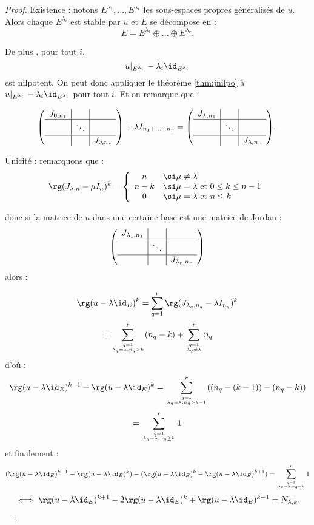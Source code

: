 \documentclass[class=report,crop=false]{standalone}
\newcommand{\Res}[1]{{\left | {}_{#1} \right.}}
\begin{document}
\begin{proof}
Existence : notons $E^{\lambda_1},...,E^{\lambda_r}$ les sous-espaces propres généralisés de $u$. Alors chaque $E^{\lambda_i}$ est stable par $u$ et $E$ se décompose en :
\[E = E^{\lambda_1} \oplus ... \oplus E^{\lambda_r} .\]

De plus , pour tout $i$, \[u\Res{E^{\lambda_i}} -\lambda_i\id_{E^{\lambda_i}}\]
est nilpotent. On peut donc appliquer le théorème \ref{thm:jnilpo} à $u\Res{E^{\lambda_i}} -\lambda_i\id_{E^{\lambda_i}}$ pour tout $i$. Et on remarque que :

\[\left(\begin{array}{c|c|c}
J_{0,n_1}&&\\\hline
&\ddots&\\\hline
&&J_{0,n_r}
\end{array}\right) + \lambda I_{n_1+...+n_r} = \left(\begin{array}{c|c|c}
J_{\lambda,n_1}&&\\\hline
&\ddots&\\\hline
&&J_{\lambda,n_r}
\end{array}\right).\]

Unicité : remarquons que :
\[\rg (J_{\lambda,n} -\mu I_n)^k = \left\{ \begin{array}{cl}
n & \si \mu \neq \lambda\\
n-k & \si \mu = \lambda \text{ et } 0 \le k \le n-1\\
0 & \si \mu = \lambda \text{ et } n \le k
\end{array}\right.\]

donc si la matrice de $u$ dans une certaine base est une matrice de Jordan :
\[
\left(\begin{array}{c|c|c}
J_{\lambda_1,n_1}&&\\\hline
&\ddots&\\\hline
&&J_{\lambda_r,n_r}
\end{array}\right)\]
alors :
 
\[\rg(u-\lambda\id_E)^k = \sum_{q=1}^r \rg ( J_{\lambda_q,n_q}-\lambda I_{n_q})^k\]
\[= \sum_{q=1\atop \lambda_q = \lambda , n_q > k}^r (n_q-k) + \sum_{q=1 \atop \lambda_q \neq \lambda}^r n_q\]
d'où :\[ \rg(u-\lambda\id_E)^{k-1} - \rg(u-\lambda\id_E)^{k } = \sum_{q=1 \atop \lambda_q = \lambda , n_q >k -1 }^r ((n_q-(k-1))-(n_q-k))  \]
\[ =  \sum_{q=1 \atop \lambda_q = \lambda , n_q \ge k }^r 1 \]
et finalement :
\[  (\rg(u-\lambda\id_E)^{k-1} - \rg(u-\lambda\id_E)^k) -  (\rg(u-\lambda\id_E)^k - \rg(u-\lambda\id_E)^{k+1}) =  \sum_{q=1 \atop \lambda_q = \lambda , n_q =k }^r 1 \]
\[\iff \rg(u-\lambda\id_E)^{k+1}-2\rg(u-\lambda\id_E)^k+\rg(u-\lambda\id_E)^{k-1} = N_{\lambda,k} .\]
\end{proof}
\end{document}
